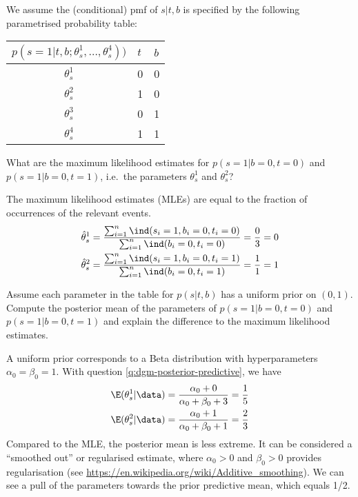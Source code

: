 We assume the (conditional) pmf of $s|t,b$ is specified by the following
parametrised probability table:
\begin{center}
  \begin{tabular}{@{}cll@{}}
    \toprule
    $p(s=1 | t, b; \theta^1_s, \ldots, \theta_s^4))$ & $t$ & $b$\\
    \midrule
    $\theta^1_s$ & 0 & 0\\
    $\theta^2_s$ & 1 & 0\\
    $\theta^3_s$ & 0 & 1\\
    $\theta^4_s$ & 1 & 1\\
    \bottomrule
  \end{tabular}
\end{center}

  \begin{exenumerate}
  \item What are the maximum likelihood estimates for $p(s=1 | b=0,
    t=0)$ and $p(s=1 | b=0, t=1)$, i.e.\ the parameters $\theta^1_s$
    and $\theta^2_s$?
    
    \begin{solution}
      The maximum likelihood estimates (MLEs) are equal to the fraction of occurrences of the relevant events.
      \begin{align}
        \hat{\theta}^1_s & =\frac{\sum_{i=1}^n \ind(s_i=1, b_i=0, t_i=0)}{\sum_{i=1}^n \ind(b_i=0, t_i=0)} = \frac{0}{3} = 0\\
        \hat{\theta}^2_s & =\frac{\sum_{i=1}^n \ind(s_i=1, b_i=0, t_i=1)}{\sum_{i=1}^n \ind(b_i=0, t_i=1)} = \frac{1}{1} = 1
      \end{align}

    \end{solution}
    
  \item Assume each parameter in the table for $p(s | t,b)$ has a
    uniform prior on $(0,1)$. Compute the posterior mean of the
    parameters of \mbox{$p(s=1 | b=0, t=0)$} and $p(s=1 | b=0, t=1)$
    and explain the difference to the maximum likelihood estimates.

    \begin{solution}
      A uniform prior corresponds to a Beta distribution with
      hyperparameters $\alpha_0=\beta_0=1$. With
       question
      \ref{q:dgm-posterior-predictive}, we have
      \begin{align}
        \E(\theta_s^1 | \data) & = \frac{\alpha_0+0}{\alpha_0+\beta_0+3} = \frac{1}{5}\\
        \E(\theta_s^2 | \data) & = \frac{\alpha_0+1}{\alpha_0+\beta_0+1} = \frac{2}{3}
      \end{align}
      Compared to the MLE, the posterior mean is less extreme. It can
      be considered a ``smoothed out'' or regularised estimate, where
      $\alpha_0 >0$ and $\beta_0>0$ provides regularisation (see
      \url{https://en.wikipedia.org/wiki/Additive_smoothing}). We can
      see a pull of the parameters towards the prior predictive mean,
      which equals 1/2.

    \end{solution}
    
  \end{exenumerate}
  
